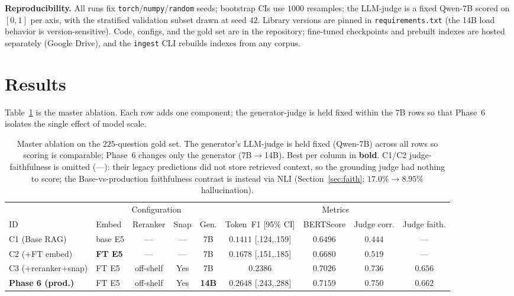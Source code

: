 \documentclass[conference]{IEEEtran}
\newcommand{\best}[1]{\textbf{#1}}
\begin{document}
\textbf{Reproducibility.} All runs fix
\texttt{torch}/\texttt{numpy}/\texttt{random} seeds; bootstrap CIs use $1000$
resamples; the LLM-judge is a fixed Qwen-7B scored on $[0,1]$ per axis, with the
stratified validation subset drawn at seed $42$. Library versions are pinned in
\texttt{requirements.txt} (the 14B load behavior is version-sensitive). Code,
configs, and the gold set are in the repository; fine-tuned checkpoints and
prebuilt indexes are hosted separately (Google Drive), and the \texttt{ingest}
CLI rebuilds indexes from any corpus.

\section{Results}
Table~\ref{tab:ablation} is the master ablation. Each row adds one component;
the generator-judge is held fixed within the 7B rows so that Phase~6 isolates
the single effect of model scale.

\begin{table}[t]
\caption{Master ablation on the $225$-question gold set. The generator's
LLM-judge is held fixed (Qwen-7B) across all rows so scoring is comparable;
Phase~6 changes only the generator (7B$\rightarrow$14B). Best per column in
\textbf{bold}. C1/C2 judge-faithfulness is omitted (---): their legacy
predictions did not store retrieved context, so the grounding judge had nothing
to score; the Base-vs-production faithfulness contrast is instead via NLI
(Section~\ref{sec:faith}; $17.0\%\rightarrow 8.95\%$ hallucination).}
\label{tab:ablation}
\centering\footnotesize
\begin{tabular}{@{}llccc c ccc@{}}
\toprule
& \multicolumn{4}{c}{Configuration} & \multicolumn{4}{c}{Metrics}\\
\cmidrule(lr){2-5}\cmidrule(lr){6-9}
ID & Embed & Reranker & Snap & Gen. & Token~F1 [95\% CI] & BERTScore & Judge corr. & Judge faith. \\
\midrule
C1 (Base RAG) & base E5 & --- & --- & 7B & $0.1411$ {\scriptsize[.124,.159]} & $0.6496$ & $0.444$ & --- \\
C2 (+FT embed) & \textbf{FT E5} & --- & --- & 7B & $0.1678$ {\scriptsize[.151,.185]} & $0.6680$ & $0.519$ & --- \\
C3 (+reranker+snap) & FT E5 & off-shelf & Yes & 7B & $0.2386$ & $0.7026$ & $0.736$ & $0.656$ \\
\textbf{Phase 6 (prod.)} & FT E5 & off-shelf & Yes & \textbf{14B} & \best{$0.2648$} {\scriptsize[.243,.288]} & \best{$0.7159$} & \best{$0.750$} & \best{$0.662$} \\
\bottomrule
\end{tabular}
\end{table}
\end{document}
